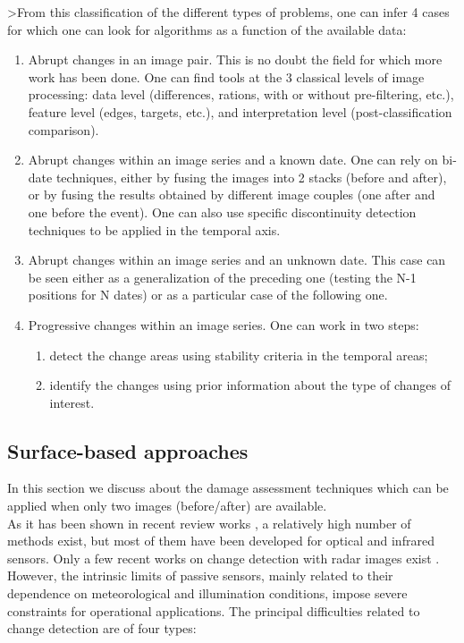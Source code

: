>From this classification of the different types of problems, one can
infer 4 cases for which one can look for algorithms as a function of
the available data:
\begin{enumerate}
\item Abrupt changes in an image pair. This is no doubt the field for
  which more work has been done. One can find tools at the 3 classical
  levels of image processing: data level (differences, rations, with
  or without pre-filtering, etc.), feature level (edges, targets,
  etc.), and interpretation level (post-classification comparison).

\item Abrupt changes within an image series and a known date. One can
  rely on bi-date techniques, either by fusing the images into 2 stacks
  (before and after), or by fusing the results obtained by different
  image couples (one after and one before the event). One can also use
  specific discontinuity detection techniques to be applied in the
  temporal axis.

\item Abrupt changes within an image series and an unknown date. This
  case can be seen either as a generalization of the preceding one (testing
  the N-1 positions for N dates) or as a particular case of the
  following one.

\item Progressive changes within an image series. One can work in two
  steps:
  \begin{enumerate}
    \item detect the change areas using stability criteria in the
    temporal areas;
    \item identify the changes using prior information about the type
    of changes of interest.
  \end{enumerate}
  
\end{enumerate}




\subsection{Surface-based approaches}\label{secChgtAbr}
In this section we discuss about the damage assessment techniques
which can be applied when only two images (before/after) are available.\\

As it has been shown in recent review works
\cite{Coppin03,Lu04,Radke05,Richards05}, a relatively high number of
methods exist, but most of them have been developed for optical and
infrared sensors. Only a few recent works on change detection with
radar images exist
\cite{Stabel02,Bruzzone02b,Onana_2003,Inglada03,Derrode03,Bazi05,Inglada07}.
However, the intrinsic limits of passive sensors, mainly related to
their dependence on meteorological and illumination conditions, impose
severe constraints for operational applications. The principal
difficulties related to change detection are of four types:

